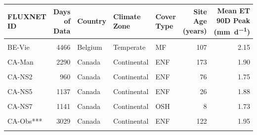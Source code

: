 \begin{table}[!h]
\centering
\caption{\label{tab:tab:site_summary}}
\centering
\fontsize{8}{10}\selectfont
\begin{tabular}[t]{lrlllrr}
\toprule
FLUXNET ID & Days of Data & Country & Climate Zone & Cover Type & Site Age (years) & Mean ET 90D Peak (\si{\milli\metre\per\day})\\
\midrule
\cellcolor{gray!10}{BE-Bra} & \cellcolor{gray!10}{3590} & \cellcolor{gray!10}{Belgium} & \cellcolor{gray!10}{Temperate} & \cellcolor{gray!10}{MF} & \cellcolor{gray!10}{92} & \cellcolor{gray!10}{2.02}\\
BE-Vie & 4466 & Belgium & Temperate & MF & 107 & 2.15\\
\cellcolor{gray!10}{CA-Gro} & \cellcolor{gray!10}{3639} & \cellcolor{gray!10}{Canada} & \cellcolor{gray!10}{Continental} & \cellcolor{gray!10}{MF} & \cellcolor{gray!10}{84} & \cellcolor{gray!10}{2.45}\\
CA-Man & 2290 & Canada & Continental & ENF & 173 & 1.90\\
\cellcolor{gray!10}{CA-NS1} & \cellcolor{gray!10}{1141} & \cellcolor{gray!10}{Canada} & \cellcolor{gray!10}{Continental} & \cellcolor{gray!10}{ENF} & \cellcolor{gray!10}{157} & \cellcolor{gray!10}{1.59}\\
\addlinespace
CA-NS2 & 960 & Canada & Continental & ENF & 76 & 1.75\\
\cellcolor{gray!10}{CA-NS3} & \cellcolor{gray!10}{1141} & \cellcolor{gray!10}{Canada} & \cellcolor{gray!10}{Continental} & \cellcolor{gray!10}{ENF} & \cellcolor{gray!10}{42} & \cellcolor{gray!10}{1.70}\\
CA-NS5 & 1137 & Canada & Continental & ENF & 26 & 1.88\\
\cellcolor{gray!10}{CA-NS6} & \cellcolor{gray!10}{1141} & \cellcolor{gray!10}{Canada} & \cellcolor{gray!10}{Continental} & \cellcolor{gray!10}{OSH} & \cellcolor{gray!10}{17} & \cellcolor{gray!10}{1.35}\\
CA-NS7 & 1141 & Canada & Continental & OSH & 8 & 1.73\\
\addlinespace
\cellcolor{gray!10}{CA-Oas} & \cellcolor{gray!10}{3029} & \cellcolor{gray!10}{Canada} & \cellcolor{gray!10}{Continental} & \cellcolor{gray!10}{DBF} & \cellcolor{gray!10}{91} & \cellcolor{gray!10}{2.82}\\
CA-Obs*** & 3029 & Canada & Continental & ENF & 122 & 1.95\\
\cellcolor{gray!10}{CA-Qfo} & \cellcolor{gray!10}{2687} & \cellcolor{gray!10}{Canada} & \cellcolor{gray!10}{Continental} & \cellcolor{gray!10}{ENF} & \cellcolor{gray!10}{106} & \cellcolor{gray!10}{1.75}\\

\end{tabular}
\end{table}
